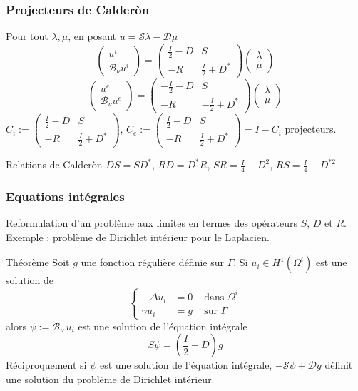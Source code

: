 \documentclass[11pt]{beamer}
\begin{document}
	\begin{frame}
		\frametitle{Projecteurs de Calderòn}
		Pour tout $\lambda, \mu$, en posant $u = \mathcal{S}\lambda - \mathcal{D}\mu$
		\begin{equation*}
			\begin{pmatrix}
			u^i  \\
			\mathcal{B}_\nu u^i
			\end{pmatrix} = 
			\begin{pmatrix}
			\frac{I}{2} - D & S \\
			-R & \frac{I}{2} + D^*
			\end{pmatrix}
			\begin{pmatrix}
			\lambda  \\
			\mu
			\end{pmatrix}
		\end{equation*}
		\begin{equation*}
		\begin{pmatrix}
		u^e  \\
		\mathcal{B}_\nu u^e
		\end{pmatrix} = 
		\begin{pmatrix}
		-\frac{I}{2} - D & S \\
		-R & -\frac{I}{2} + D^*
		\end{pmatrix}
		\begin{pmatrix}
		\lambda  \\
		\mu
		\end{pmatrix}
		\end{equation*}
		$C_i := \begin{pmatrix}
		\frac{I}{2} - D & S \\
		-R & \frac{I}{2} + D^*
		\end{pmatrix}$, 
		$C_e:=\begin{pmatrix}
			\frac{I}{2} - D & S \\
			-R & \frac{I}{2} + D^*
		\end{pmatrix} = I - C_i$ projecteurs. 
		\begin{block}{Relations de Calderòn}
			\centering
			$DS = SD^*$, $RD = D^*R$, $SR = \frac{I}{4} - D^2$, $RS = \frac{I}{4} - D^{*2}$
		\end{block}
	\end{frame}
	\begin{frame}
		\frametitle{Equations intégrales}
		Reformulation d'un problème aux limites en termes des opérateurs $S$, $D$ et $R$. 
		Exemple : problème de Dirichlet intérieur pour le Laplacien. 
		\begin{block}{Théorème}
			Soit $g$ une fonction régulière définie sur $\Gamma$. Si $u_i \in H^1(\Omega^i)$ est une solution de 
			\[\left\{ \begin{array}{ccl}
			-\Delta u_i &= 0 &\text{ dans } \Omega^i\\
			\gamma u_i &= g & \text{ sur }\Gamma 
			\end{array}\right.\]
			alors $\psi:=\mathcal{B}_\nu^- u_i$ est une solution de l'équation intégrale 
			\[S\psi = \left(\frac{I}{2}+D\right)g\]
			Réciproquement si $\psi$ est une solution de l'équation intégrale,  $-\mathcal{S}\psi + \mathcal{D}g$ définit une solution du problème de Dirichlet intérieur. 
		\end{block}
	\end{frame}
\end{document}

